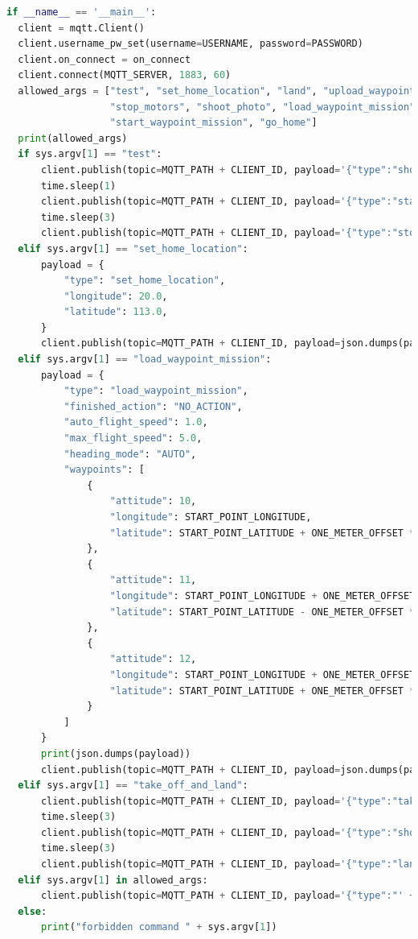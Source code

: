 \newpage
\begin{lstlisting}[language=Python, caption=Skrypt przeznaczony do publikowania na nasłuchiwanym przez urządzenie latające Topic-u komend.]
  if __name__ == '__main__':
  client = mqtt.Client()
  client.username_pw_set(username=USERNAME, password=PASSWORD)
  client.on_connect = on_connect
  client.connect(MQTT_SERVER, 1883, 60)
  allowed_args = ["test", "set_home_location", "land", "upload_waypoint_mission", "take_off", "start_motors",
                  "stop_motors", "shoot_photo", "load_waypoint_mission", "take_off_and_land", "stop_waypoint_mission",
                  "start_waypoint_mission", "go_home"]
  print(allowed_args)
  if sys.argv[1] == "test":
      client.publish(topic=MQTT_PATH + CLIENT_ID, payload='{"type":"shoot_photo"}')
      time.sleep(1)
      client.publish(topic=MQTT_PATH + CLIENT_ID, payload='{"type":"start_motors"}')
      time.sleep(3)
      client.publish(topic=MQTT_PATH + CLIENT_ID, payload='{"type":"stop_motors"}')
  elif sys.argv[1] == "set_home_location":
      payload = {
          "type": "set_home_location",
          "longitude": 20.0,
          "latitude": 113.0,
      }
      client.publish(topic=MQTT_PATH + CLIENT_ID, payload=json.dumps(payload))
  elif sys.argv[1] == "load_waypoint_mission":
      payload = {
          "type": "load_waypoint_mission",
          "finished_action": "NO_ACTION",
          "auto_flight_speed": 1.0,
          "max_flight_speed": 5.0,
          "heading_mode": "AUTO",
          "waypoints": [
              {
                  "attitude": 10,
                  "longitude": START_POINT_LONGITUDE,
                  "latitude": START_POINT_LATITUDE + ONE_METER_OFFSET * 0.5
              },
              {
                  "attitude": 11,
                  "longitude": START_POINT_LONGITUDE + ONE_METER_OFFSET * 1,
                  "latitude": START_POINT_LATITUDE - ONE_METER_OFFSET * 1
              },
              {
                  "attitude": 12,
                  "longitude": START_POINT_LONGITUDE + ONE_METER_OFFSET * 2,
                  "latitude": START_POINT_LATITUDE + ONE_METER_OFFSET * 1
              }
          ]
      }
      print(json.dumps(payload))
      client.publish(topic=MQTT_PATH + CLIENT_ID, payload=json.dumps(payload))
  elif sys.argv[1] == "take_off_and_land":
      client.publish(topic=MQTT_PATH + CLIENT_ID, payload='{"type":"take_off"}')
      time.sleep(3)
      client.publish(topic=MQTT_PATH + CLIENT_ID, payload='{"type":"shoot_photo"}')
      time.sleep(3)
      client.publish(topic=MQTT_PATH + CLIENT_ID, payload='{"type":"land"}')
  elif sys.argv[1] in allowed_args:
      client.publish(topic=MQTT_PATH + CLIENT_ID, payload='{"type":"' + sys.argv[1] + '"}')
  else:
      print("forbidden command " + sys.argv[1])
\end{lstlisting}

